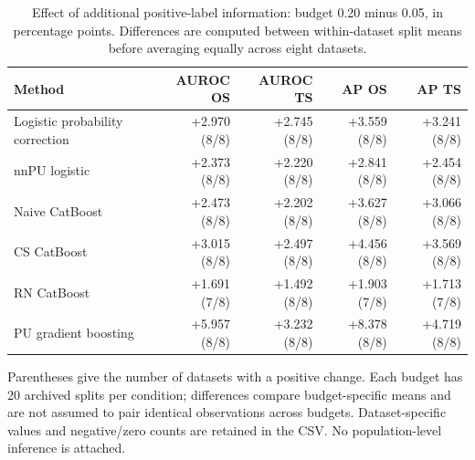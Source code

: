 \begin{table}[t]
\centering
\caption{Effect of additional positive-label information: budget 0.20 minus 0.05, in percentage points. Differences are computed between within-dataset split means before averaging equally across eight datasets.}
\label{tab:s-real-budget-effects}
\small
\setlength{\tabcolsep}{3.5pt}
\renewcommand{\arraystretch}{1.08}
\begin{tabularx}{\textwidth}{>{\raggedright\arraybackslash}Xrrrr}
\toprule
Method & AUROC OS & AUROC TS & AP OS & AP TS \\
\midrule
Logistic probability correction & +2.970 (8/8) & +2.745 (8/8) & +3.559 (8/8) & +3.241 (8/8) \\
nnPU logistic & +2.373 (8/8) & +2.220 (8/8) & +2.841 (8/8) & +2.454 (8/8) \\
Naive CatBoost & +2.473 (8/8) & +2.202 (8/8) & +3.627 (8/8) & +3.066 (8/8) \\
CS CatBoost & +3.015 (8/8) & +2.497 (8/8) & +4.456 (8/8) & +3.569 (8/8) \\
RN CatBoost & +1.691 (7/8) & +1.492 (8/8) & +1.903 (7/8) & +1.713 (7/8) \\
PU gradient boosting & +5.957 (8/8) & +3.232 (8/8) & +8.378 (8/8) & +4.719 (8/8) \\
\bottomrule
\end{tabularx}
\par\medskip
\begin{minipage}{\textwidth}\small
Parentheses give the number of datasets with a positive change. Each budget has 20 archived splits per condition; differences compare budget-specific means and are not assumed to pair identical observations across budgets. Dataset-specific values and negative/zero counts are retained in the CSV. No population-level inference is attached.
\end{minipage}
\end{table}
